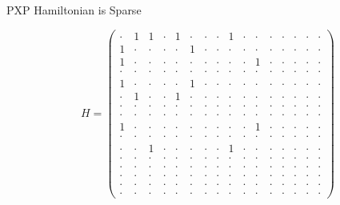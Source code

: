 \documentclass[aspectratio=169]{beamer}
\begin{document}
\begin{frame}{PXP Hamiltonian is Sparse}
\footnotesize
 
    \begin{equation}\label{eq:L4fullmatrix}
H =
\begin{pmatrix} 
\cdot & 1 & 1 & \cdot & 1 & \cdot & \cdot & \cdot & 1 & \cdot & \cdot & \cdot & \cdot & \cdot & \cdot & \cdot \\
1 & \cdot & \cdot & \cdot & \cdot & 1 & \cdot & \cdot & \cdot & \cdot & \cdot & \cdot & \cdot & \cdot & \cdot & \cdot \\
1 & \cdot & \cdot & \cdot & \cdot & \cdot & \cdot & \cdot & \cdot & \cdot & 1 & \cdot & \cdot & \cdot & \cdot & \cdot \\
\cdot & \cdot & \cdot & \cdot & \cdot & \cdot & \cdot & \cdot & \cdot & \cdot & \cdot & \cdot & \cdot & \cdot & \cdot & \cdot \\
1 & \cdot & \cdot & \cdot & \cdot & 1 & \cdot & \cdot & \cdot & \cdot & \cdot & \cdot & \cdot & \cdot & \cdot & \cdot \\
\cdot & 1 & \cdot & \cdot & 1 & \cdot & \cdot & \cdot & \cdot & \cdot & \cdot & \cdot & \cdot & \cdot & \cdot & \cdot \\
\cdot & \cdot & \cdot & \cdot & \cdot & \cdot & \cdot & \cdot & \cdot & \cdot & \cdot & \cdot & \cdot & \cdot & \cdot & \cdot \\
\cdot & \cdot & \cdot & \cdot & \cdot & \cdot & \cdot & \cdot & \cdot & \cdot & \cdot & \cdot & \cdot & \cdot & \cdot & \cdot \\
1 & \cdot & \cdot & \cdot & \cdot & \cdot & \cdot & \cdot & \cdot & \cdot & 1 & \cdot & \cdot & \cdot & \cdot & \cdot \\
\cdot & \cdot & \cdot & \cdot & \cdot & \cdot & \cdot & \cdot & \cdot & \cdot & \cdot & \cdot & \cdot & \cdot & \cdot & \cdot \\
\cdot & \cdot & 1 & \cdot & \cdot & \cdot & \cdot & \cdot & 1 & \cdot & \cdot & \cdot & \cdot & \cdot & \cdot & \cdot \\
\cdot & \cdot & \cdot & \cdot & \cdot & \cdot & \cdot & \cdot & \cdot & \cdot & \cdot & \cdot & \cdot & \cdot & \cdot & \cdot \\
\cdot & \cdot & \cdot & \cdot & \cdot & \cdot & \cdot & \cdot & \cdot & \cdot & \cdot & \cdot & \cdot & \cdot & \cdot & \cdot \\
\cdot & \cdot & \cdot & \cdot & \cdot & \cdot & \cdot & \cdot & \cdot & \cdot & \cdot & \cdot & \cdot & \cdot & \cdot & \cdot \\
\cdot & \cdot & \cdot & \cdot & \cdot & \cdot & \cdot & \cdot & \cdot & \cdot & \cdot & \cdot & \cdot & \cdot & \cdot & \cdot \\
\cdot & \cdot & \cdot & \cdot & \cdot & \cdot & \cdot & \cdot & \cdot & \cdot & \cdot & \cdot & \cdot & \cdot & \cdot & \cdot
\end{pmatrix}
\end{equation}
\end{frame}
\end{document}
